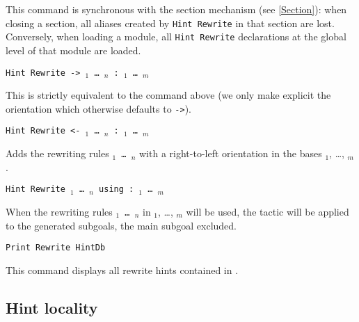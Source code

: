 \begin{coq_example*}
This command is synchronous with the section mechanism (see \ref{Section}):
when closing a section, all aliases created by \texttt{Hint Rewrite} in that
section are lost. Conversely, when loading a module, all \texttt{Hint Rewrite}
declarations at the global level of that module are loaded.

\begin{Variants}
\item {\tt Hint Rewrite -> \term$_1$ \mbox{\dots} \term$_n$ :~\ident$_1$ \mbox{\dots} \ident$_m$}

This is strictly equivalent to the command above (we only make explicit the
orientation which otherwise defaults to {\tt ->}).

\item {\tt Hint Rewrite <- \term$_1$ \mbox{\dots} \term$_n$ :~\ident$_1$ \mbox{\dots} \ident$_m$}

Adds the rewriting rules {\tt \term$_1$ \mbox{\dots} \term$_n$} with a right-to-left
orientation in the bases \ident$_1$, \dots, \ident$_m$.

\item {\tt Hint Rewrite \term$_1$ \mbox{\dots} \term$_n$ using {\tac} :~\ident$_1$ \mbox{\dots} \ident$_m$}

When the rewriting rules {\tt \term$_1$ \mbox{\dots} \term$_n$} in \ident$_1$, \dots, \ident$_m$ will
be used, the tactic {\tt \tac} will be applied to the generated subgoals, the
main subgoal excluded.


\item \texttt{Print Rewrite HintDb {\ident}}

  This command displays all rewrite hints contained in {\ident}.

\end{Variants}

\subsection{Hint locality
\label{Hint-Locality}}


\end{coq_example*}
